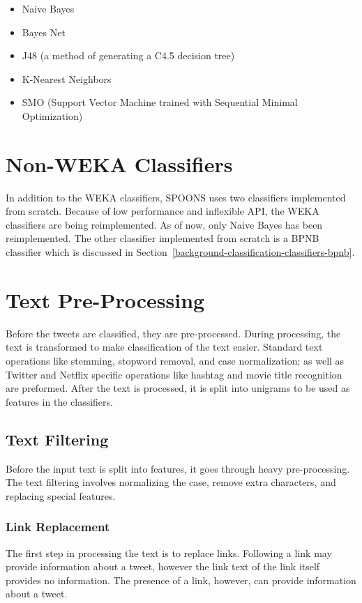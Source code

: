 \documentclass[12pt]{ucthesis}
\begin{document}
\begin{itemize}
   \item Naive Bayes
   \item Bayes Net
   \item J48 (a method of generating a C4.5 decision tree\cite{j48})
   \item K-Nearest Neighbors
   \item SMO (Support Vector Machine trained with Sequential Minimal Optimization\cite{smo})
\end{itemize}

\section{Non-WEKA Classifiers}
\label{class-nonweka}
In addition to the WEKA classifiers, SPOONS uses two classifiers implemented from scratch.
Because of low performance and inflexible API, the WEKA classifiers are being reimplemented.
As of now, only Naive Bayes has been reimplemented. The other classifier implemented from scratch is
a BPNB classifier which is discussed in Section~\ref{background-classification-classifiers-bpnb}.

\section{Text Pre-Processing}
\label{class-processing}
Before the tweets are classified, they are pre-processed. During processing, the text is transformed
to make classification of the text easier. Standard text operations like stemming, stopword removal,
and case normalization; as well as Twitter and Netflix specific operations like hashtag and movie title
recognition are preformed. After the text is processed, it is split into unigrams to be used as features
in the classifiers.

\subsection{Text Filtering}
\label{class-filter}
Before the input text is split into features, it goes through heavy pre-processing.
The text filtering involves normalizing the case, remove extra characters, and replacing special features.

\subsubsection{Link Replacement}
\label{class-filter-link-replacement}
The first step in processing the text is to replace links.
Following a link may provide information about a tweet, however the link text of the link
itself provides no information. The presence of a link, however, can provide information about
a tweet.
\end{document}
